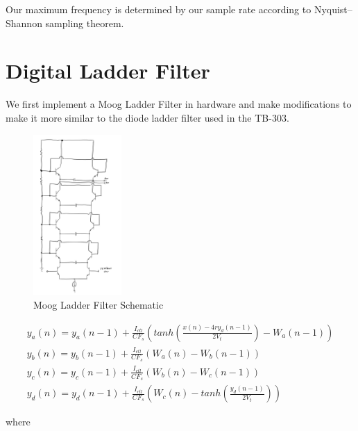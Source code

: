 \documentclass{article}
\begin{document}
        Our maximum frequency is determined by our sample rate according to
        Nyquist–Shannon sampling theorem. 

        \vspace{3mm}
        
    
    \newpage

    \section*{Digital Ladder Filter}

    We first implement a Moog Ladder Filter in hardware and make modifications
    to make it more similar to the diode ladder filter used in the TB-303.
    
    \begin{figure}[!ht]
        \centering
        \includegraphics[width=0.3\textwidth]{moog_ladder.png}
        \caption{Moog Ladder Filter Schematic}
        \label{fig:fig4}
    \end{figure}


    \begin{gather}
        y_a(n) = y_a(n-1) + \frac{I_{ctl}}{C F_s} \left( tanh \left( \frac{x(n) - 4 r y_d(n-1)}{2 V_t} \right) - W_a(n-1) \right) \\
        y_b(n) = y_b(n-1) + \frac{I_{ctl}}{C F_s} \left( W_a(n) - W_b(n-1)  \right) \\
        y_c(n) = y_c(n-1) + \frac{I_{ctl}}{C F_s} \left( W_b(n) - W_c(n-1)  \right) \\
        y_d(n) = y_d(n-1) + \frac{I_{ctl}}{C F_s} \left( W_c(n) - tanh\left( \frac{y_d(n-1)}{2 V_t} \right) \right)
    \end{gather}

    \medskip

    where
\end{document}
